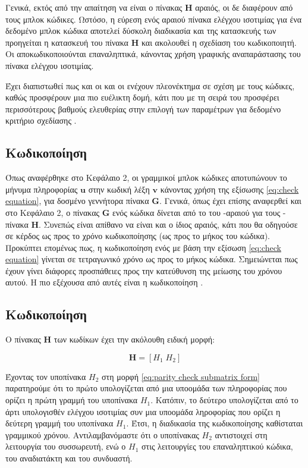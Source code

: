 Γενικά, εκτός από την απαίτηση να είναι ο πίνακας $\mathbf{H}$ αραιός, οι  δε διαφέρουν από τους μπλοκ κώδικες. Ωστόσο, η εύρεση ενός αραιού πίνακα ελέγχου ισοτιμίας για ένα δεδομένο μπλοκ κώδικα αποτελεί δύσκολη διαδικασία και της κατασκευής των  προηγείται η κατασκευή του πίνακα $\mathbf{H}$ και ακολουθεί η σχεδίαση του κωδικοποιητή. Οι  αποκωδικοποιούνται επαναληπτικά, κάνοντας χρήση γραφικής αναπαράστασης του πίνακα ελέγχου ισοτιμίας.

Έχει διαπιστωθεί πως και οι  και οι   ενέχουν πλεονέκτημα σε σχέση με τους  κώδικες, καθώς προσφέρουν μια πιο ευέλικτη δομή, κάτι που με τη σειρά του προσφέρει περισσότερους βαθμούς ελευθερίας στην επιλογή των παραμέτρων για δεδομένο κριτήριο σχεδίασης \cite{johnson2009iterative}.

\subsection{Κωδικοποίηση }

Όπως αναφέρθηκε στο Κεφάλαιο 2, οι γραμμικοί μπλοκ κώδικες αποτυπώνουν το μήνυμα πληροφορίας $\mathbf{u}$ στην κωδική λέξη $\mathbf{v}$ κάνοντας χρήση της εξίσωσης \ref{eq:check equation}, για δοσμένο γεννήτορα πίνακα $\mathbf{G}$. Γενικά, όπως έχει επίσης αναφερθεί και στο Κεφάλαιο 2, ο πίνακας $\mathbf{G}$ ενός κώδικα δίνεται από το  του -αραιού για τους - πίνακα $\mathbf{H}$. Συνεπώς είναι απίθανο να είναι και ο ίδιος αραιός, κάτι που θα οδηγούσε σε κέρδος ως προς το χρόνο κωδικοποίησης (ως προς το μήκος του κώδικα). Προκύπτει επομένως πως, η κωδικοποίηση ενός  με βάση την εξίσωση \ref{eq:check equation} γίνεται σε τετραγωνικό χρόνο ως προς το μήκος κώδικα. Σημειώνεται πως έχουν γίνει διάφορες προσπάθειες προς την κατεύθυνση της μείωσης του χρόνου αυτού. Η πιο εξέχουσα από αυτές είναι η κωδικοποίηση  \cite{ta2013tutorial}.

\subsection{Κωδικοποίηση }

Ο πίνακας $\mathbf{H}$ των  κωδίκων έχει την ακόλουθη ειδική μορφή: 

\begin{equation}
\mathbf{Η} = \left[Η_1\;Η_2\right]
\label{eq:form of RA parity matrix}
\end{equation}

Έχοντας τον υποπίνακα $H_2$ στη μορφή \ref{eq:parity check submatrix form} παρατηρούμε ότι το πρώτο  υπολογίζεται από μια υποομάδα των  πληροφορίας που ορίζει η πρώτη γραμμή του υποπίνακα $H_1$. Κατόπιν, το δεύτερο  υπολογίζεται από το άρτι υπολογισθέν  ελέγχου ισοτιμίας συν μια υποομάδα  ληροφορίας που ορίζει η δεύτερη γραμμή του υποπίνακα $H_1$. Έτσι, η διαδικασία της κωδικοποίησης καθίσταται γραμμικού χρόνου. Αντιλαμβανόμαστε ότι ο υποπίνακας $H_2$ αντιστοιχεί στη λειτουργία του συσσωρευτή, ενώ ο $H_1$ στις λειτουργίες του επαναληπτικού κώδικα, του αναδιατάκτη και του συνδυαστή.


